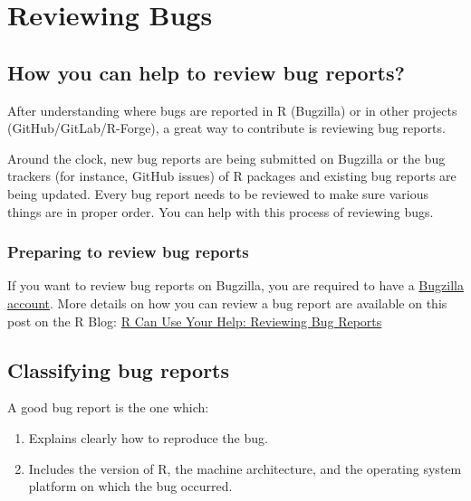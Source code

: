 \documentclass[
  letterpaper,
  DIV=11,
  numbers=noendperiod]{scrreprt}
\begin{document}

\chapter{Reviewing Bugs}\label{ReviewBugs}

\section{How you can help to review bug
reports?}\label{how-you-can-help-to-review-bug-reports}

After understanding where bugs are reported in R (Bugzilla) or in other
projects (GitHub/GitLab/R-Forge), a great way to contribute is reviewing
bug reports.

Around the clock, new bug reports are being submitted on Bugzilla or the
bug trackers (for instance, GitHub issues) of R packages and existing
bug reports are being updated. Every bug report needs to be reviewed to
make sure various things are in proper order. You can help with this
process of reviewing bugs.

\subsection{Preparing to review bug
reports}\label{preparing-to-review-bug-reports}

If you want to review bug reports on Bugzilla, you are required to have
a \hyperref[bugzilla-account]{Bugzilla account}. More details on how you
can review a bug report are available on this post on the R Blog:
\href{https://blog.r-project.org/2019/10/09/r-can-use-your-help-reviewing-bug-reports/index.html}{R
Can Use Your Help: Reviewing Bug Reports}

\section{Classifying bug reports}\label{classifying-bug-reports}

A good bug report is the one which:

\begin{enumerate}
\def\labelenumi{\arabic{enumi}.}
\item
  Explains clearly how to reproduce the bug.
\item
  Includes the version of R, the machine architecture, and the operating
  system platform on which the bug occurred.
\end{enumerate}
\end{document}
